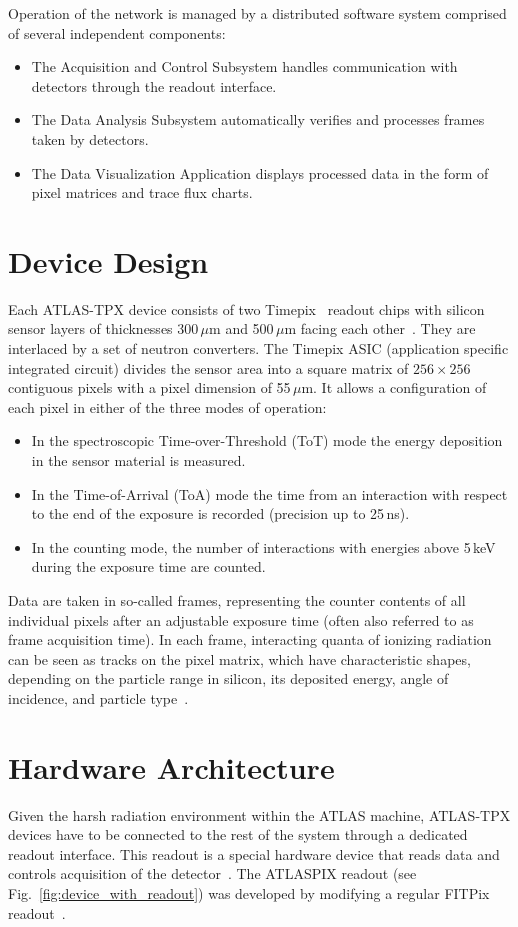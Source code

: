 \documentclass[journal]{IEEEtran}
\begin{document}
Operation of the network is managed by a distributed software system comprised of several independent components:
~
\begin{itemize}
\item The Acquisition and Control Subsystem handles communication with detectors through the readout interface.
\item The Data Analysis Subsystem automatically verifies and processes frames taken by detectors.
\item The Data Visualization Application displays processed data in the form of pixel matrices and trace flux charts.
\end{itemize}

\section{\label{sec:device}Device Design}
Each ATLAS-TPX device consists of two Timepix~\cite{Llopart2007} readout chips with silicon sensor layers of thicknesses 300\,$\mu$m and 500\,$\mu$m facing each other~\cite{Bergmann_ATLASTPX_2016}. They are interlaced by a set of neutron converters. The Timepix ASIC (application specific integrated circuit) divides the sensor area into a square matrix of $256 \times 256$ contiguous pixels with a pixel dimension of 55\,$\mu$m. It allows a configuration of each pixel in either of the three modes of operation: 
~
\begin{itemize}
\item In the spectroscopic Time-over-Threshold (ToT) mode the energy deposition in the sensor material is measured.
\item In the Time-of-Arrival (ToA) mode the time from an interaction with respect to the end of the exposure is recorded (precision up to 25\,ns).
\item In the counting mode, the number of interactions with energies above 5\,keV during the exposure time are counted.
\end{itemize}

Data are taken in so-called frames, representing the counter contents of all individual pixels after an adjustable exposure time (often also referred to as frame acquisition time). In each frame, interacting quanta of ionizing radiation can be seen as tracks on the pixel matrix, which have characteristic shapes, depending on the particle range in silicon, its deposited energy, angle of incidence, and particle type~\cite{Holy2008}.

\section{\label{sec:hardware}Hardware Architecture}
Given the harsh radiation environment within the ATLAS machine, ATLAS-TPX devices have to be connected to the rest of the system through a dedicated readout interface. This readout is a special hardware device that reads data and controls acquisition of the detector~\cite{Pixelman}. The ATLASPIX readout (see Fig.~\ref{fig:device_with_readout}) was developed by modifying a regular FITPix readout~\cite{FITPix}.
\end{document}
